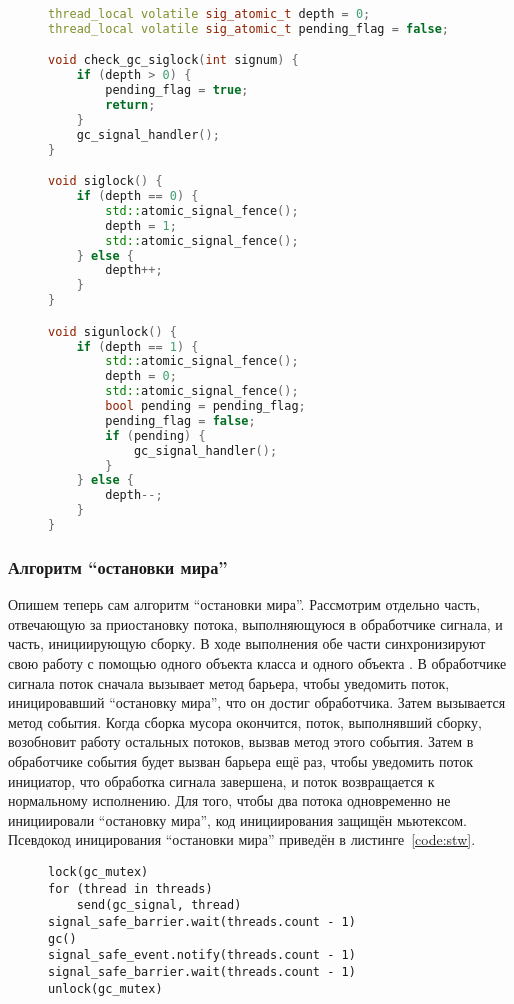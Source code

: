 \begin{figure}
\begin{lstlisting}[language={c++}, caption={Блокирование доставки сигналов}, label={code:siglock}, basicstyle=\small]
thread_local volatile sig_atomic_t depth = 0;
thread_local volatile sig_atomic_t pending_flag = false;

void check_gc_siglock(int signum) {
    if (depth > 0) {
        pending_flag = true;
        return;
    }
    gc_signal_handler();
}

void siglock() {
    if (depth == 0) {
        std::atomic_signal_fence();
        depth = 1;
        std::atomic_signal_fence();
    } else {
        depth++;
    }
}

void sigunlock() {
    if (depth == 1) {
        std::atomic_signal_fence();
        depth = 0;
        std::atomic_signal_fence();
        bool pending = pending_flag;
        pending_flag = false;
        if (pending) {
            gc_signal_handler();
        }
    } else {
        depth--;
    }
}
\end{lstlisting}
\end{figure}


\subsubsection{Алгоритм ``остановки мира''}
Опишем теперь сам алгоритм ``остановки мира''. 
Рассмотрим отдельно часть, отвечающую за приостановку потока, выполняющуюся в 
обработчике сигнала, и часть, инициирующую сборку. 
В ходе выполнения обе части синхронизируют свою работу с помощью одного объекта класса 
 и одного объекта . 
В обработчике сигнала поток сначала вызывает метод  барьера, чтобы 
уведомить поток, иницировавший ``остановку мира'', что он достиг обработчика. 
Затем вызывается метод  события. 
Когда сборка мусора окончится, поток, выполнявший сборку, возобновит работу остальных 
потоков, вызвав метод  этого события. 
Затем в обработчике события будет вызван  барьера ещё раз, чтобы 
уведомить поток инициатор, что обработка сигнала завершена, и поток возвращается к 
нормальному исполнению. 
Для того, чтобы два потока одновременно не инициировали ``остановку мира'', код инициирования 
защищён мьютексом. 
Псевдокод иницирования ``остановки мира'' приведён в листинге~\ref{code:stw}.

\begin{figure}[h!]
\begin{lstlisting}[caption={Остановка мира},label={code:stw}]
lock(gc_mutex)
for (thread in threads)
    send(gc_signal, thread)
signal_safe_barrier.wait(threads.count - 1)
gc()
signal_safe_event.notify(threads.count - 1)
signal_safe_barrier.wait(threads.count - 1)
unlock(gc_mutex)
\end{lstlisting}
\end{figure}


